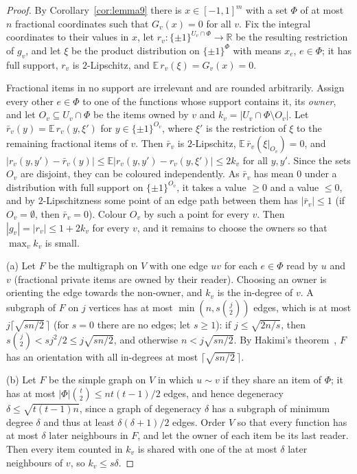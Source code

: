 \documentclass[11pt,letterpaper]{article}
\theoremstyle{definition}
\newcommand{\R}{\mathbb{R}}
\newcommand{\E}{\mathbb{E}}
\newcommand{\cube}[1]{\{\pm1\}^{#1}}
\begin{document}
\begin{proof}
By Corollary~\ref{cor:lemma9} there is $x\in[-1,1]^m$ with a set $\Phi$ of at most $n$ fractional
coordinates such that $G_v(x)=0$ for all $v$. Fix the integral coordinates to their values in $x$,
let $r_v\colon\cube{U_v\cap\Phi}\to\R$ be the resulting restriction of $g_v$, and let $\xi$ be the
product distribution on $\cube\Phi$ with means $x_e$, $e\in\Phi$; it has full support, $r_v$ is
$2$-Lipschitz, and $\E\,r_v(\xi)=G_v(x)=0$.

Fractional items in no support are irrelevant and are rounded arbitrarily. Assign every other
$e\in\Phi$ to one of the functions whose support contains it, its \emph{owner}, and let
$O_v\subseteq U_v\cap\Phi$ be the items owned by $v$ and $k_v=|U_v\cap\Phi\setminus O_v|$. Let
$\bar r_v(y)=\E\,r_v(y,\xi')$ for $y\in\cube{O_v}$, where $\xi'$ is the restriction of $\xi$ to the
remaining fractional items of $v$. Then $\bar r_v$ is $2$-Lipschitz, $\E\,\bar r_v(\xi|_{O_v})=0$,
and $|r_v(y,y')-\bar r_v(y)|\le\E|r_v(y,y')-r_v(y,\xi')|\le2k_v$ for all $y,y'$. Since the sets
$O_v$ are disjoint, they can be coloured independently. As $\bar r_v$ has mean $0$ under a
distribution with full support on $\cube{O_v}$, it takes a value $\ge0$ and a value $\le0$, and by
$2$-Lipschitzness some point of an edge path between them has $|\bar r_v|\le1$ (if $O_v=\emptyset$,
then $\bar r_v=0$). Colour $O_v$ by such a point for every $v$. Then $|g_v|=|r_v|\le1+2k_v$ for every
$v$, and it remains to choose the owners so that $\max_vk_v$ is small.

(a) Let $F$ be the multigraph on $V$ with one edge $uv$ for each $e\in\Phi$ read by $u$ and $v$
(fractional private items are owned by their reader). Choosing an owner is orienting the edge
towards the non-owner, and $k_v$ is the in-degree of $v$. A subgraph of $F$ on $j$ vertices has at
most $\min(n,s\binom j2)$ edges, which is at most $j\lceil\sqrt{sn/2}\,\rceil$ (for $s=0$ there are no
edges; let $s\ge1$): if $j\le\sqrt{2n/s}$,
then $s\binom j2<sj^2/2\le j\sqrt{sn/2}$, and otherwise $n<j\sqrt{sn/2}$. By Hakimi's
theorem~\cite{Hak65}, $F$ has an orientation with all in-degrees at most $\lceil\sqrt{sn/2}\,\rceil$.

(b) Let $F$ be the simple graph on $V$ in which $u\sim v$ if they share an item of $\Phi$; it has at
most $|\Phi|\binom t2\le nt(t-1)/2$ edges, and hence degeneracy $\delta\le\sqrt{t(t-1)n}$, since a graph
of degeneracy $\delta$ has a subgraph of minimum degree $\delta$ and thus at least
$\delta(\delta+1)/2$ edges. Order $V$ so that every function has at most $\delta$ later neighbours
in $F$, and let the owner of each item be its last reader. Then every item counted in $k_v$ is
shared with one of the at most $\delta$ later neighbours of $v$, so $k_v\le s\delta$.
\end{proof}
\end{document}
